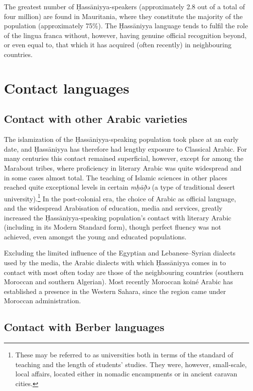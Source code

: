 \documentclass[output=paper]{langsci/langscibook}
\begin{document}
The greatest number of Ḥassāniyya-speakers (approximately 2.8 out of a total of four million) are found in Mauritania, where they constitute the majority of the population (approximately 75\%). The Ḥassāniyya language tends to fulfil the role of the lingua franca without, however, having genuine official recognition beyond, or even equal to, that which it has acquired (often recently) in neighbouring countries.

\section{ Contact languages} %

\subsection{ Contact with other Arabic varieties} %

The islamization of the Ḥassāniyya-speaking population took place at an early date, and Ḥassāniyya has therefore had lengthy exposure to Classical Arabic. For many centuries this contact remained superficial, however, except for among the Marabout tribes, where proficiency in literary Arabic was quite widespread and in some cases almost total. The teaching of Islamic sciences in other places reached quite exceptional levels in certain \textit{mḥāð̣ə{\R}} (a type of traditional desert university).\footnote{These may be referred to as universities both in terms of the standard of teaching and the length of students’ studies. They were, however, small-scale, local affairs, located either in nomadic encampments or in ancient caravan cities.} In the post-colonial era, the choice of Arabic as official language, and the widespread Arabisation of education, media and services, greatly increased the Ḥassāniyya-speaking population’s contact with literary Arabic (including in its Modern Standard form), though perfect fluency was not achieved, even amongst the young and educated populations. 

Excluding the limited influence of the Egyptian and Lebanese–Syrian dialects used by the media, the Arabic dialects with which Ḥassāniyya comes in to contact with most often today are those of the neighbouring countries (southern Moroccan and southern Algerian). Most recently Moroccan koiné Arabic has established a presence in the Western Sahara, since the region came under Moroccan administration. 

\subsection{ Contact with Berber languages} %
\end{document}
